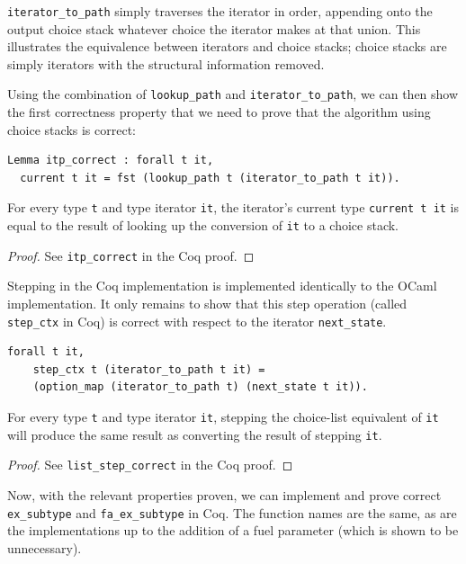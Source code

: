 \documentclass[a4paper,english]{lipics-v2019}
\begin{document}
\verb|iterator_to_path| simply traverses the iterator in order, appending onto the
output choice stack whatever choice the iterator makes at that union. This illustrates
the equivalence between iterators and choice stacks; choice stacks are simply iterators
with the structural information removed.

Using the combination of \verb|lookup_path| and \verb|iterator_to_path|, we
can then show the first correctness property that we need to prove that the
algorithm using choice stacks is correct:

\begin{lemma}
\begin{small}\begin{verbatim}
Lemma itp_correct : forall t it, 
  current t it = fst (lookup_path t (iterator_to_path t it)).
\end{verbatim}\end{small}

For every type \verb|t| and type iterator \verb|it|, the iterator's current type \verb|current t it| is equal
to the result of looking up the conversion of \verb|it| to a choice stack.
\end{lemma}
\begin{proof}
See \verb|itp_correct| in the Coq proof.
\end{proof}

Stepping in the Coq implementation is implemented identically to the OCaml
implementation. It only remains to show that this step operation (called
\verb|step_ctx| in Coq) is correct with respect to the iterator
\verb|next_state|.

\begin{lemma}
\begin{small}\begin{verbatim}
forall t it,
    step_ctx t (iterator_to_path t it) =
    (option_map (iterator_to_path t) (next_state t it)).
\end{verbatim}\end{small}
For every type \verb|t| and type iterator \verb|it|,
stepping the choice-list equivalent of \verb|it| will
produce the same result as converting the result of stepping
\verb|it|.
\end{lemma}
\begin{proof}
See \verb|list_step_correct| in the Coq proof.
\end{proof}

Now, with the relevant properties proven, we can implement and prove correct
\verb|ex_subtype| and \verb|fa_ex_subtype| in Coq. The function names are the
same, as are the implementations up to the addition of a fuel parameter (which
is shown to be unnecessary). 
\end{document}
